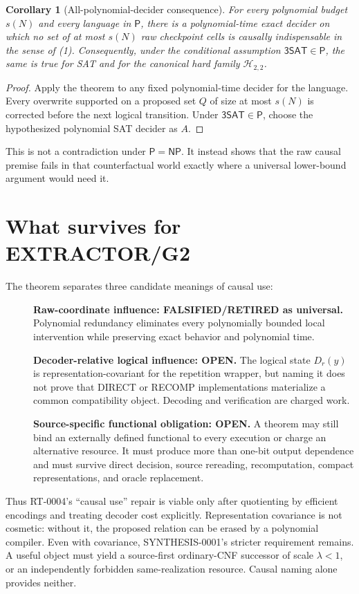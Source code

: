 \documentclass[11pt]{article}
\newtheorem{corollary}{Corollary}
\newcommand{\SAT}{\mathsf{3SAT}}
\newcommand{\Pclass}{\mathsf P}
\newcommand{\NPclass}{\mathsf{NP}}
\begin{document}
\begin{corollary}[All-polynomial-decider consequence]
For every polynomial budget $s(N)$ and every language in $\Pclass$, there is
a polynomial-time exact decider on which no set of at most $s(N)$ raw
checkpoint cells is causally indispensable in the sense of (1).
Consequently, under the conditional assumption $\SAT\in\Pclass$, the same is
true for SAT and for the canonical hard family $\mathcal H_{2,2}$.
\end{corollary}
\begin{proof}
Apply the theorem to any fixed polynomial-time decider for the language.
Every overwrite supported on a proposed set $Q$ of size at most $s(N)$ is
corrected before the next logical transition.  Under $\SAT\in\Pclass$, choose
the hypothesized polynomial SAT decider as $A$.
\end{proof}

This is not a contradiction under $\Pclass=\NPclass$.  It instead shows that
the raw causal premise fails in that counterfactual world exactly where a
universal lower-bound argument would need it.

\section{What survives for EXTRACTOR/G2}
The theorem separates three candidate meanings of causal use:
\begin{description}
\item[] \textbf{Raw-coordinate influence: FALSIFIED/RETIRED as universal.}
Polynomial redundancy eliminates every polynomially bounded local
intervention while preserving exact behavior and polynomial time.
\item[] \textbf{Decoder-relative logical influence: OPEN.}
The logical state $D_r(y)$ is representation-covariant for the repetition
wrapper, but naming it does not prove that DIRECT or RECOMP implementations
materialize a common compatibility object.  Decoding and verification are
charged work.
\item[] \textbf{Source-specific functional obligation: OPEN.}
A theorem may still bind an externally defined functional to every execution
or charge an alternative resource.  It must produce more than one-bit output
dependence and must survive direct decision, source rereading, recomputation,
compact representations, and oracle replacement.
\end{description}

Thus RT-0004's ``causal use'' repair is viable only after quotienting by
efficient encodings and treating decoder cost explicitly.  Representation
covariance is not cosmetic: without it, the proposed relation can be erased
by a polynomial compiler.  Even with covariance, SYNTHESIS-0001's stricter
requirement remains.  A useful object must yield a source-first ordinary-CNF
successor of scale $\lambda<1$, or an independently forbidden same-realization
resource.  Causal naming alone provides neither.
\end{document}

